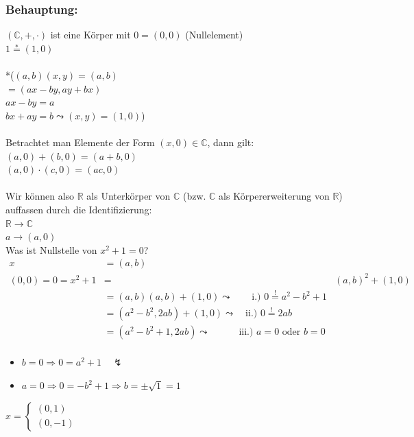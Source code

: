 \subsubsection{Behauptung:}
$(\mathbb{C},+,\cdot)$ ist eine Körper mit $0=(0,0)$ (Nullelement)\\
$1\mathop{=}\limits^{\text{*}}(1,0)$\\
\qquad\\
*($(a,b)(x,y)=(a,b)$\\
$=(ax-by,ay+bx)$\\
$ax-by=a$\\
$bx+ay=b \leadsto(x,y)=(1,0)$)\\
\qquad\\
Betrachtet man Elemente der Form $(x,0) \in \mathbb{C}$, dann gilt:\\
$(a,0)+(b,0)=(a+b,0)$\\
$(a,0)\cdot(c,0)=(ac,0)$\\
\qquad\\
Wir können also $\mathbb{R}$ als Unterkörper von $\mathbb{C}$ (bzw. $\mathbb{C}$ als Körpererweiterung von $\mathbb{R}$) auffassen durch die Identifizierung:\\
$\mathbb{R}\rightarrow\mathbb{C}$\\
$a\rightarrow(a,0)$\\
Was ist Nullstelle von $x^{2}+1=0$?
 \begin{align}
	x&=(a,b)\\
    (0,0)=0=x^{2}+1 &=& (a,b)^{2}+(1,0) \\
	&= (a,b)(a,b)+(1,0) \leadsto \qquad \text{i.) }0\mathop{=}\limits^{\text{!}}a^{2}-b^{2}+1\\
	&= (a^{2}-b^{2},2ab)+(1,0) \leadsto \quad \text{ii.) } 0 \mathop{=}\limits^{\text{!}} 2ab\\
	&= (a^{2}-b^{2}+1,2ab) \leadsto \qquad \quad \text{iii.) } a=0 \text{ oder } b=0\\
  \end{align}
\begin{itemize}
	\item $b=0 \Rightarrow 0=a^{2}+1 \quad \lightning$
	\item $a=0 \Rightarrow 0=-b^{2}+1\Rightarrow b = \pm\sqrt{1} = 1$
\end{itemize}
$
x=\left\{
\begin{array}{l}     
    (0,1)\\
    (0,-1)
\end{array}\right.
$\\
\qquad\\

